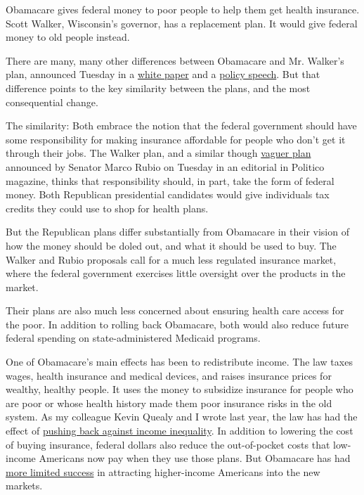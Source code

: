 Obamacare gives federal money to poor people to help them get health
insurance. Scott Walker, Wisconsin's governor, has a replacement plan.
It would give federal money to old people instead.

There are many, many other differences between Obamacare and Mr.
Walker's plan, announced Tuesday in a
\href{https://www.scottwalker.com/obamacare-plan/files/Day-One-Patient-Freedom-Plan.pdf}{white
paper} and a
\href{http://www.c-span.org/video/?327681-1/governor-scott-walker-rwi-remarks-health-care}{policy
speech}. But that difference points to the key similarity between the
plans, and the most consequential change.

The similarity: Both embrace the notion that the federal government
should have some responsibility for making insurance affordable for
people who don't get it through their jobs. The Walker plan, and a
similar though
\href{http://www.politico.com/magazine/story/2015/08/marco-rubio-plan-to-fix-health-care-121453.html\#.VdMjkixVikr}{vaguer
plan} announced by Senator Marco Rubio on Tuesday in an editorial in
Politico magazine, thinks that responsibility should, in part, take the
form of federal money. Both Republican presidential candidates would
give individuals tax credits they could use to shop for health plans.

But the Republican plans differ substantially from Obamacare in their
vision of how the money should be doled out, and what it should be used
to buy. The Walker and Rubio proposals call for a much less regulated
insurance market, where the federal government exercises little
oversight over the products in the market.

Their plans are also much less concerned about ensuring health care
access for the poor. In addition to rolling back Obamacare, both would
also reduce future federal spending on state-administered Medicaid
programs.

One of Obamacare's main effects has been to redistribute income. The law
taxes wages, health insurance and medical devices, and raises insurance
prices for wealthy, healthy people. It uses the money to subsidize
insurance for people who are poor or whose health history made them poor
insurance risks in the old system. As my colleague Kevin Quealy and I
wrote last year, the law has had the effect of
\href{http://www.nytimes.com/interactive/2014/10/29/upshot/obamacare-who-was-helped-most.html}{pushing
back against income inequality}. In addition to lowering the cost of
buying insurance, federal dollars also reduce the out-of-pocket costs
that low-income Americans now pay when they use those plans. But
Obamacare has had
\href{http://www.seattletimes.com/nation-world/analysis-federal-subsidies-expand-coverage-but-difficulties-persist/}{more
limited success} in attracting higher-income Americans into the new
markets.


